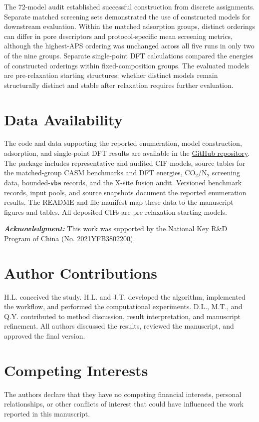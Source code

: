 \documentclass[a5paper, 10pt]{article}
\newcommand{\acknowledgment}[1]{\vspace{5mm}\singlespacing
  {\noindent\textbf{\textit{Acknowledgment\/:}} #1}
}
\begin{document}
The 72-model audit established successful construction from discrete assignments. Separate matched screening sets demonstrated the use of constructed models for downstream evaluation. Within the matched adsorption groups, distinct orderings can differ in pore descriptors and protocol-specific mean screening metrics, although the highest-APS ordering was unchanged across all five runs in only two of the nine groups. Separate single-point DFT calculations compared the energies of constructed orderings within fixed-composition groups. The evaluated models are pre-relaxation starting structures; whether distinct models remain structurally distinct and stable after relaxation requires further evaluation.

\section*{Data Availability}
\label{sec:data}
The code and data supporting the reported enumeration, model construction, adsorption, and single-point DFT results are available in the \href{https://github.com/Buct454/mof-enumeration-reconstruction.git}{GitHub repository}. The package includes representative and audited CIF models, source tables for the matched-group CASM benchmarks and DFT energies, CO$_2$/N$_2$ screening data, bounded-\texttt{vba} records, and the X-site fusion audit. Versioned benchmark records, input pools, and source snapshots document the reported enumeration results. The README and file manifest map these data to the manuscript figures and tables. All deposited CIFs are pre-relaxation starting models.

\acknowledgment{This work was supported by the National Key R\&D Program of China (No. 2021YFB3802200).}

\section*{Author Contributions}
H.L. conceived the study. H.L. and J.T. developed the algorithm, implemented the workflow, and performed the computational experiments. D.L., M.T., and Q.Y. contributed to method discussion, result interpretation, and manuscript refinement. All authors discussed the results, reviewed the manuscript, and approved the final version.


\section*{Competing Interests}
The authors declare that they have no competing financial interests, personal relationships, or other conflicts of interest that could have influenced the work reported in this manuscript.
\end{document}
